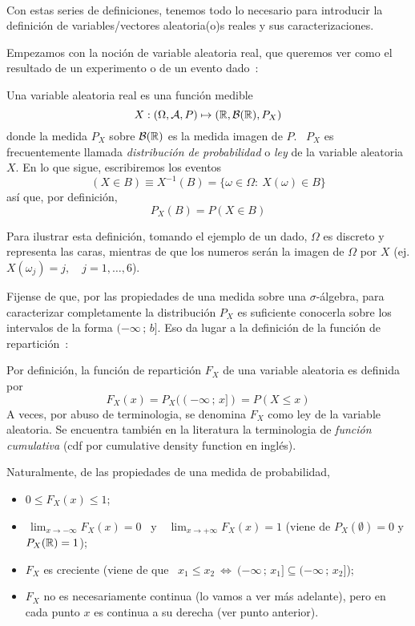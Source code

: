 \

Con estas series  de definiciones, tenemos todo lo  necesario para introducir la
definici\'on de variables/vectores aleatoria(o)s reales y sus caracterizaciones.



\label{sec:MP:VAGeneral}

Empezamos con la  noci\'on de variable aleatoria real, que  queremos ver como el
resultado de un experimento o de un evento dado~\cite{AthLah06, Coh13, Bre88}:
%
\begin{definicion}
  Una variable aleatoria real es una funci\'on medible
  \[
  X: (\Omega,\mathcal{A},P) \mapsto (\mathbb{R},\mathcal{B}(\mathbb{R}),P_X)
  \]
  donde la medida  $P_X$ sobre $\mathcal{B}(\mathbb{R})$ es la medida imagen  de $P$.  \ $P_X$
  es frecuentemente llamada {\it distribuci\'on  de probabilidad} o {\it ley} de
  la variable aleatoria $X$. En lo que sigue, escribiremos los eventos
  \[
  (X \in B) \equiv X^{-1}(B) = \{ \omega \in \Omega: \: X(\omega) \in B \}
  \]
  as\'i que, por definici\'on,
  \[
  P_X(B) = P(X \in B)
  \]
\end{definicion}
%
Para  ilustrar esta definici\'on,  tomando el  ejemplo de  un dado,  $\Omega$ es
discreto y representa  las caras, mientras de que los  numeros ser\'an la imagen
de $\Omega$ por $X$ (ej. $X(\omega_j) = j, \quad j = 1, \ldots , 6$).

Fijense de que, por las  propiedades de una medida sobre una $\sigma$-\'algebra,
para caracterizar completamente la  distribuci\'on $P_X$ es suficiente conocerla
sobre  los intervalos de  la forma  $(-\infty \,  ; \,  b]$. Eso  da lugar  a la
definici\'on  de  la funci\'on  de  repartici\'on~\cite{AthLah06, Coh13,  Bre88,
  HogMck13}:
%
\begin{definicion}
  Por  definici\'on,  la  funci\'on  de  repartici\'on  $F_X$  de  una  variable
  aleatoria es definida por
  \[
  F_X(x) = P_X((-\infty \, ; \, x]) = P(X \le x)
  \]
  A veces, por abuso de terminologia,  se denomina $F_X$ como ley de la variable
  aleatoria. Se  encuentra tambi\'en  en la literatura  la terminologia  de {\it
    funci\'on cumulativa} (cdf por cumulative density function en ingl\'es).
\end{definicion}
%
Naturalmente, de las propiedades de una medida de probabilidad,
%
\begin{itemize}
\item $0 \le F_X(x) \le 1$;
%
\item $\displaystyle \, \lim_{x \to -\infty} F_X(x) = 0$ \ y \ $\displaystyle \,
  \lim_{x \to +\infty} F_X(x) = 1$  (viene de $P_X(\emptyset) = 0$ y $P_X(\mathbb{R})
  = 1$);
%
\item  $F_X$ es creciente  \big(viene de  que \  $x_1 \le  x_2 \:  \Leftrightarrow \:
  (-\infty \, ; \, x_1] \subseteq (-\infty \, ; \, x_2]$\big);
%
\item $F_X$ no es necesariamente continua  (lo vamos a ver m\'as adelante), pero
  en cada punto $x$ es continua a su derecha (ver punto anterior).
\end{itemize}


